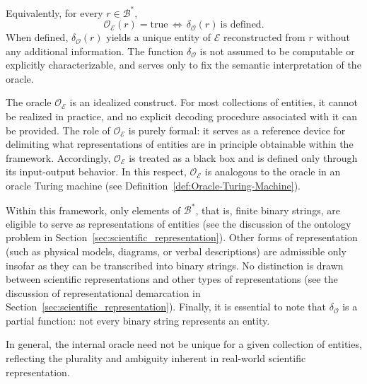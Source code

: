 \noindent
Equivalently, for every \(r \in \mathcal{B}^\ast\),
\[
\mathcal{O}_{\mathcal{E}}(r)=\mathrm{true} \, \Longleftrightarrow \, \delta_{\mathcal{O}}(r)\ \text{is defined}.
\]
When defined, $\delta_{\mathcal{O}}(r)$ yields a unique entity of $\mathcal{E}$ reconstructed from $r$ without any additional information. The function $\delta_{\mathcal{O}}$ is not assumed to be computable or explicitly characterizable, and serves only to fix the semantic interpretation of the oracle.

The oracle $\mathcal{O}_{\mathcal{E}}$ is an idealized construct. For most collections of entities, it cannot be realized in practice, and no explicit decoding procedure associated with it can be provided. The role of $\mathcal{O}_{\mathcal{E}}$ is purely formal: it serves as a reference device for delimiting what representations of entities are in principle obtainable within the framework. Accordingly, $\mathcal{O}_{\mathcal{E}}$ is treated as a black box and is defined only through its input-output behavior. In this respect, $\mathcal{O}_{\mathcal{E}}$ is analogous to the oracle in an oracle Turing machine (see Definition~\ref{def:Oracle-Turing-Machine}).

Within this framework, only elements of $\mathcal{B}^\ast$, that is, finite binary strings, are eligible to serve as representations of entities (see the discussion of the ontology problem in Section~\ref{sec:scientific_representation}). Other forms of representation (such as physical models, diagrams, or verbal descriptions) are admissible only insofar as they can be transcribed into binary strings. No distinction is drawn between scientific representations and other types of representations (see the discussion of representational demarcation in Section~\ref{sec:scientific_representation}). Finally, it is essential to note that $\delta_{\mathcal{O}}$ is a partial function: not every binary string represents an entity.

In general, the internal oracle need not be unique for a given collection of entities, reflecting the plurality and ambiguity inherent in real-world scientific representation.

